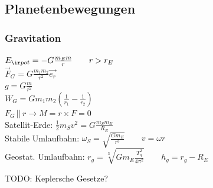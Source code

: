 \begin{sectionbox}
    \subsection{Planetenbewegungen}
    \subsubsection{Gravitation}
    $E_{\ir pot}=-G\frac{m_E  m}{r} \qquad r>r_E$\\
    $\vec{F}_G=G\frac{m_1m_2}{r^2}  \vec{e_r}$\\
    $g=G  \frac{m}{r^2}$\\
    $W_G=Gm_1m_2(\frac{1}{r_1}-\frac{1}{r_2})$\\
    $F_G \, || \, r \rightarrow M=r\times F=0$\\

    Satellit-Erde: $\frac{1}{2}m_Sv^2=G\frac{m_Sm_E}{R_E}$ \\
    Stabile Umlaufbahn: $\omega_S=\sqrt{\frac{G  m_E}{r^3}}\qquad v=\omega r$\\
    Geostat. Umlaufbahn: $r_g=\sqrt[3]{G  m_E   \frac{T_g^2}{4\pi^2}} \qquad h_g=r_g-R_E$

    TODO: Keplersche Gesetze?
\end{sectionbox}